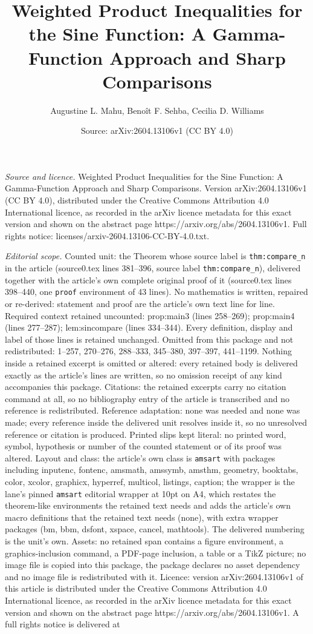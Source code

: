 \documentclass[10pt,a4paper]{amsart}
\title[Weighted Product Inequalities for the Sine Function: A Gamma]{Weighted Product Inequalities for the Sine Function: A Gamma-Function Approach and Sharp Comparisons}
\author{Augustine L. Mahu, Beno\^it F. Sehba, Cecilia D. Williams}
\date{Source: arXiv:2604.13106v1 (CC BY 4.0)}
\begin{document}
\maketitle

\noindent\emph{Source and licence.} Weighted Product Inequalities for the Sine Function: A Gamma-Function Approach and Sharp Comparisons. Version arXiv:2604.13106v1 (CC BY 4.0), distributed under the Creative Commons Attribution 4.0 International licence, as recorded in the arXiv licence metadata for this exact version and shown on the abstract page https://arxiv.org/abs/2604.13106v1. Full rights notice: licenses/arxiv-2604.13106-CC-BY-4.0.txt.\par\smallskip

\noindent\textit{Editorial scope.} Counted unit: the Theorem whose source label is \texttt{thm:compare\_n} in the article (source0.tex lines 381--396, source label \texttt{thm:compare\_n}), delivered together with the article's own complete original proof of it (source0.tex lines 398--440, one \texttt{proof} environment of 43 lines). No mathematics is written, repaired or re-derived: statement and proof are the article's own text line for line. Required context retained uncounted: prop:main3 (lines 258--269); prop:main4 (lines 277--287); lem:sincompare (lines 334--344). Every definition, display and label of those lines is retained unchanged. Omitted from this package and not redistributed: 1--257, 270--276, 288--333, 345--380, 397--397, 441--1199. Nothing inside a retained excerpt is omitted or altered: every retained body is delivered exactly as the article's lines are written, so no omission receipt of any kind accompanies this package. Citations: the retained excerpts carry no citation command at all, so no bibliography entry of the article is transcribed and no reference is redistributed. Reference adaptation: none was needed and none was made; every reference inside the delivered unit resolves inside it, so no unresolved reference or citation is produced. Printed slips kept literal: no printed word, symbol, hypothesis or number of the counted statement or of its proof was altered. Layout and class: the article's own class is \texttt{amsart} with packages including inputenc, fontenc, amsmath, amssymb, amsthm, geometry, booktabs, color, xcolor, graphicx, hyperref, multicol, listings, caption; the wrapper is the lane's pinned \texttt{amsart} editorial wrapper at 10pt on A4, which restates the theorem-like environments the retained text needs and adds the article's own macro definitions that the retained text needs (none), with extra wrapper packages (bm, bbm, dsfont, xspace, cancel, mathtools). The delivered numbering is the unit's own. Assets: no retained span contains a figure environment, a graphics-inclusion command, a PDF-page inclusion, a table or a TikZ picture; no image file is copied into this package, the package declares no asset dependency and no image file is redistributed with it. Licence: version arXiv:2604.13106v1 of this article is distributed under the Creative Commons Attribution 4.0 International licence, as recorded in the arXiv licence metadata for this exact version and shown on the abstract page https://arxiv.org/abs/2604.13106v1. A full rights notice is delivered at 
\end{document}

